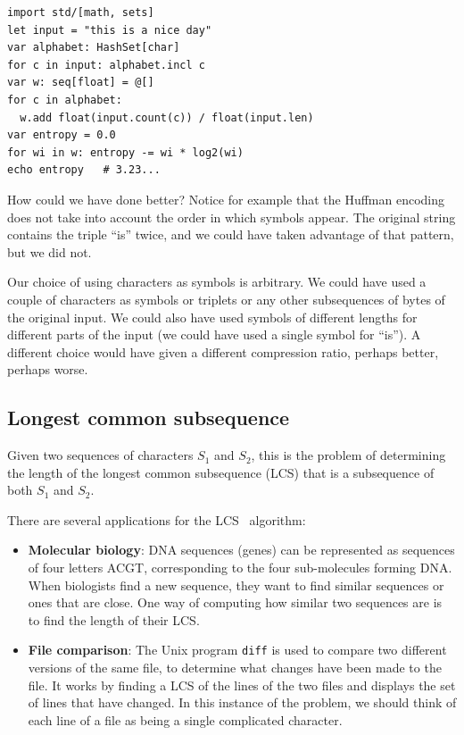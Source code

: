 \documentclass[justified, sixbynine]{tufte-book}
\def\ft{\small\tt}
\theoremstyle{plain}%
\newtheorem * {corollary}{Corollary}
\theoremstyle{definition}
\theoremstyle{remark}
\newtheorem * {remark}{Remark}
\newtheorem * {note}{Note}
\begin{document}
\begin{fullwidth}
\begin{lstlisting}
import std/[math, sets]
let input = "this is a nice day"
var alphabet: HashSet[char]
for c in input: alphabet.incl c
var w: seq[float] = @[]
for c in alphabet:
  w.add float(input.count(c)) / float(input.len)
var entropy = 0.0
for wi in w: entropy -= wi * log2(wi)
echo entropy   # 3.23...
\end{lstlisting}

How could we have done better? Notice for example that the Huffman encoding does not take into account the order in which symbols appear. The original string contains the triple ``is'' twice, and we could have taken advantage of that pattern, but we did not.

Our choice of using characters as symbols is arbitrary. We could have used a couple of characters as symbols or triplets or any other subsequences of bytes of the original input. We could also have used symbols of different lengths for different parts of the input (we could have used a single symbol for ``is''). A different choice would have given a different compression ratio, perhaps better, perhaps worse.

\subsection{Longest common subsequence}


Given two sequences of characters $S_1$ and $S_2$, this is the problem of determining the length of the longest common subsequence (LCS) that is a subsequence of both $S_1$ and $S_2$.

There are several applications for the LCS~\cite{bergroth} algorithm:

\begin{itemize}
\item  {\bf Molecular biology}: DNA sequences (genes) can be represented as sequences of four letters ACGT, corresponding to the four sub-molecules forming DNA. When biologists find a new sequence, they want to find similar sequences or ones that are close. One way of computing how similar two sequences are is to find the length of their LCS.

\item  {\bf File comparison}: The Unix program {\ft diff} is used to compare
two different versions of the same file, to determine what changes have been
made to the file. It works by finding a LCS of the
lines of the two files and displays the set of lines that have changed. In
this instance of the problem, we should think of each line of a file as being
a single complicated character.


\end{itemize}
\end{fullwidth}
\end{document}
